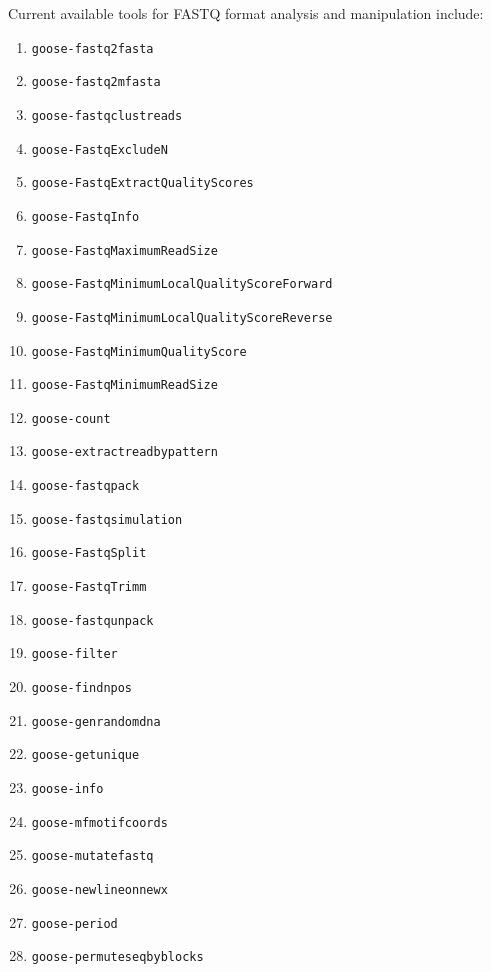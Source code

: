 \documentclass[11pt,journal,compsoc]{report}[1]
\begin{document}
Current available tools for FASTQ format analysis and manipulation include:
\begin{enumerate}

\item \texttt{goose-fastq2fasta}
\item \texttt{goose-fastq2mfasta}
\item \texttt{goose-fastqclustreads}
\item \texttt{goose-FastqExcludeN}
\item \texttt{goose-FastqExtractQualityScores}
\item \texttt{goose-FastqInfo}
\item \texttt{goose-FastqMaximumReadSize}
\item \texttt{goose-FastqMinimumLocalQualityScoreForward}
\item \texttt{goose-FastqMinimumLocalQualityScoreReverse}
\item \texttt{goose-FastqMinimumQualityScore}
\item \texttt{goose-FastqMinimumReadSize}

\item \texttt{goose-count}
\item \texttt{goose-extractreadbypattern}



\item \texttt{goose-fastqpack}
\item \texttt{goose-fastqsimulation}
\item \texttt{goose-FastqSplit}
\item \texttt{goose-FastqTrimm}
\item \texttt{goose-fastqunpack}
\item \texttt{goose-filter}
\item \texttt{goose-findnpos}

\item \texttt{goose-genrandomdna}
\item \texttt{goose-getunique}
\item \texttt{goose-info}
\item \texttt{goose-mfmotifcoords}



\item \texttt{goose-mutatefastq}
\item \texttt{goose-newlineonnewx}
\item \texttt{goose-period}
\item \texttt{goose-permuteseqbyblocks}



\end{enumerate}
\end{document}
